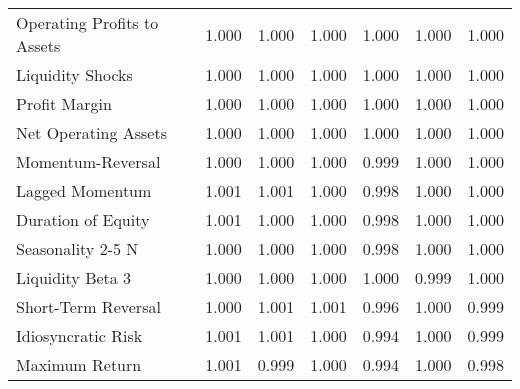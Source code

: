 \begin{tabular}{lrrrrrr}
Operating Profits to Assets                &  1.000 &  1.000 &  1.000 &  1.000 &  1.000 &  1.000 \\
Liquidity Shocks                           &  1.000 &  1.000 &  1.000 &  1.000 &  1.000 &  1.000 \\
Profit Margin                              &  1.000 &  1.000 &  1.000 &  1.000 &  1.000 &  1.000 \\
Net Operating Assets                       &  1.000 &  1.000 &  1.000 &  1.000 &  1.000 &  1.000 \\
Momentum-Reversal                          &  1.000 &  1.000 &  1.000 &  0.999 &  1.000 &  1.000 \\
Lagged Momentum                            &  1.001 &  1.001 &  1.000 &  0.998 &  1.000 &  1.000 \\
Duration of Equity                         &  1.001 &  1.000 &  1.000 &  0.998 &  1.000 &  1.000 \\
Seasonality 2-5 N                          &  1.000 &  1.000 &  1.000 &  0.998 &  1.000 &  1.000 \\
Liquidity Beta 3                           &  1.000 &  1.000 &  1.000 &  1.000 &  0.999 &  1.000 \\
Short-Term Reversal                        &  1.000 &  1.001 &  1.001 &  0.996 &  1.000 &  0.999 \\
Idiosyncratic Risk                         &  1.001 &  1.001 &  1.000 &  0.994 &  1.000 &  0.999 \\
Maximum Return                             &  1.001 &  0.999 &  1.000 &  0.994 &  1.000 &  0.998 \\
\bottomrule
\end{tabular}
